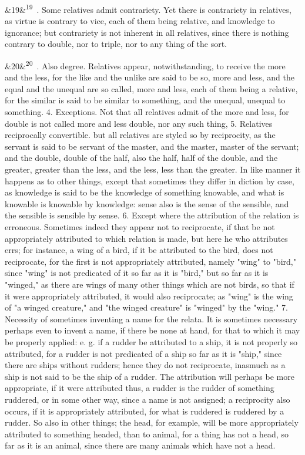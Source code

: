 \documentclass[12pt]{article}
\newcommand{\para}[1][]{\par\noindent\ifx&#1&\else\textsuperscript{\footnotesize #1}~\fi}
\begin{document}
\para[19] 2. Some relatives admit contrariety. Yet there is contrariety in relatives, as virtue is contrary to vice, each of them being relative, and knowledge to ignorance; but contrariety is not inherent in all relatives, since there is nothing contrary to double, nor to triple, nor to any thing of the sort.

\para[20] 3. Also degree. Relatives appear, notwithstanding, to receive the more and the less, for the like and the unlike are said to be so, more and less, and the equal and the unequal are so called, more and less, each of them being a relative, for the similar is said to be similar to something, and the unequal, unequal to something. 4. Exceptions. Not that all relatives admit of the more and less, for double is not called more and less double, nor any such thing, 5. Relatives reciprocally convertible. but all relatives are styled so by reciprocity, as the servant is said to be servant of the master, and the master, master of the servant; and the double, double of the half, also the half, half of the double, and the greater, greater than the less, and the less, less than the greater. In like manner it happens as to other things, except that sometimes they differ in diction by case, as knowledge is said to be the knowledge of something knowable, and what is knowable is knowable by knowledge: sense also is the sense of the sensible, and the sensible is sensible by sense. 6. Except where the attribution of the relation is erroneous. Sometimes indeed they appear not to reciprocate, if that be not appropriately attributed to which relation is made, but here he who attributes errs; for instance, a wing of a bird, if it be attributed to the bird, does not reciprocate, for the first is not appropriately attributed, namely "wing" to "bird," since "wing" is not predicated of it so far as it is "bird," but so far as it is "winged," as there are wings of many other things which are not birds, so that if it were appropriately attributed, it would also reciprocate; as "wing" is the wing of "a winged creature," and "the winged creature" is "winged" by the "wing." 7. Necessity of sometimes inventing a name for the relata. It is sometimes necessary perhaps even to invent a name, if there be none at hand, for that to which it may be properly applied: e. g. if a rudder be attributed to a ship, it is not properly so attributed, for a rudder is not predicated of a ship so far as it is "ship," since there are ships without rudders; hence they do not reciprocate, inasmuch as a ship is not said to be the ship of a rudder. The attribution will perhaps be more appropriate, if it were attributed thus, a rudder is the rudder of something ruddered, or in some other way, since a name is not assigned; a reciprocity also occurs, if it is appropriately attributed, for what is ruddered is ruddered by a rudder. So also in other things; the head, for example, will be more appropriately attributed to something headed, than to animal, for a thing has not a head, so far as it is an animal, since there are many animals which have not a head.
\end{document}
